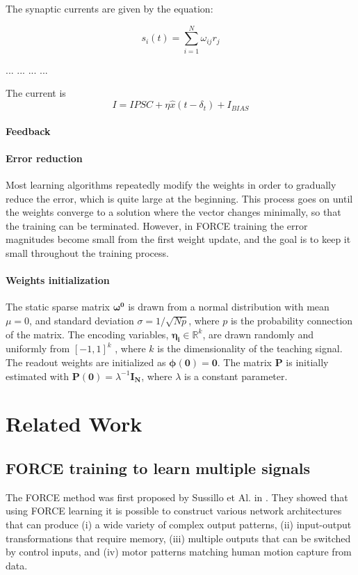 \documentclass[10pt,a4paper, final]{report} %
\begin{document}
The synaptic currents are given by the equation:

\begin{equation}
s_i(t) = \sum_{i=1}^N \omega_{ij} r_j
\end{equation}

... ... ... ...

The current is
\begin{equation}
I = IPSC + \eta \hat{x}(t- \delta_t) + I_{BIAS}
\end{equation}

\paragraph{Feedback}

\paragraph{Error reduction}
Most learning algorithms repeatedly modify the weights in order to gradually reduce the error, which is quite large at the beginning. This process goes on until the weights converge to a solution where the vector changes minimally, so that the training can be terminated. However, in FORCE training the error magnitudes become small from the first weight update, and the goal is to keep it small throughout the training process. 

\paragraph{Weights initialization}
The static sparse matrix $\bm{\omega^0}$ is drawn from a normal distribution with mean $\mu = 0$, and standard deviation $\sigma = 1/\sqrt{Np}$, where $p$ is the probability connection of the matrix. 
The encoding variables, $\bm{\eta_i} \in \mathbb{R}^k$, are drawn randomly and uniformly from $[-1,1]^k$ , where $k$ is the dimensionality of the teaching signal.
The readout weights are initialized as $\bm{\phi(0) = 0}$.
The matrix $\bm{P}$ is initially estimated with $\bm{P(0)} = \lambda^{-1} \bm{I_N }$, where $\lambda$ is a constant parameter.

\section{Related Work}
\label{sec:related_work}

\subsection{FORCE training to learn multiple signals}
The FORCE method was first proposed by Sussillo et Al. in \cite{sussillo2009generating}. They showed that using FORCE learning it is possible to construct various network architectures that can produce (i) a wide variety of complex output patterns, (ii) input-output transformations that require memory, (iii) multiple outputs that can be switched by control inputs, and (iv) motor patterns matching human motion capture from data. 
\end{document}
